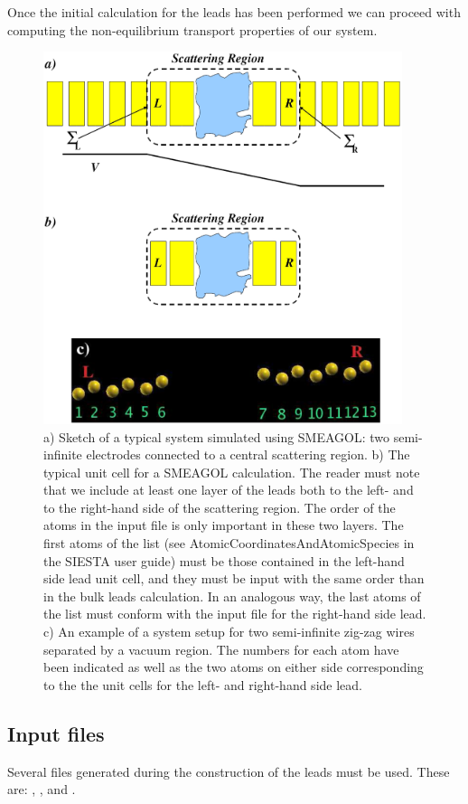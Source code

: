 \documentclass[11pt]{article}
\begin{document}
Once the initial calculation for the leads has been performed we can proceed with computing the non-equilibrium transport properties of our system.
\begin{figure}
\center
\includegraphics[width=10.5cm,clip=true]{fig/Fig3}
\caption{a) Sketch of a typical system simulated using SMEAGOL: two semi-infinite electrodes connected
to a central scattering region. b) The typical unit cell for a SMEAGOL calculation. The reader
must note that we include at least one layer of the leads both to the left- and to the right-hand side of
the scattering region. The order of the atoms in the input file is only important in these two layers. The
first atoms of the list (see AtomicCoordinatesAndAtomicSpecies in the SIESTA user guide) must be
those contained in the left-hand side lead unit cell, and they must be input with the same order than
in the bulk leads calculation. In an analogous way, the last atoms of the list must conform with the
input file for the right-hand side lead. c) An example of a system setup for two semi-infinite zig-zag wires
separated by a vacuum region. The numbers for each atom have been indicated as well as the two atoms
on either side corresponding to the the unit cells for the left- and right-hand side lead.}
\label{fig:system}
\end{figure}


\subsection{Input files}
Several files generated during the construction of the leads must be used. These are: , ,  and .
\end{document}
